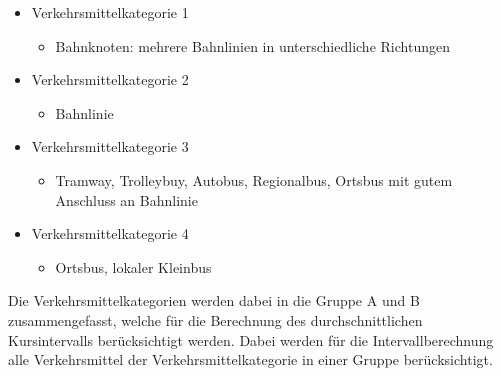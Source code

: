 \begin{itemize}[noitemsep]
    \item Verkehrsmittelkategorie 1
    \begin{itemize}
        \item Bahnknoten: mehrere Bahnlinien in unterschiedliche Richtungen
    \end{itemize}
    \item Verkehrsmittelkategorie 2
    \begin{itemize}
        \item Bahnlinie
    \end{itemize}
    \item Verkehrsmittelkategorie 3
    \begin{itemize}
        \item Tramway, Trolleybuy, Autobus, Regionalbus, Ortsbus mit gutem Anschluss an Bahnlinie
    \end{itemize}
    \item Verkehrsmittelkategorie 4
    \begin{itemize}
        \item Ortsbus, lokaler Kleinbus
    \end{itemize}
\end{itemize}

Die Verkehrsmittelkategorien werden dabei in die Gruppe A und B zusammengefasst, welche für die Berechnung des durchschnittlichen Kursintervalls berücksichtigt werden.
Dabei werden für die Intervallberechnung alle Verkehrsmittel der Verkehrsmittelkategorie in einer Gruppe berücksichtigt.

